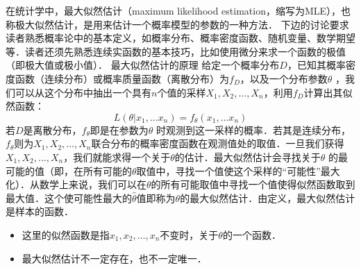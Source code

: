 \begin{issues}
\issueTODO
\end{issues}

在统计学中，最大似然估计（maximum likelihood estimation，缩写为MLE），也称极大似然估计，是用来估计一个概率模型的参数的一种方法．
下边的讨论要求读者熟悉概率论中的基本定义，如概率分布、概率密度函数、随机变量、数学期望等．读者还须先熟悉连续实函数的基本技巧，比如使用微分来求一个函数的极值（即极大值或极小值）．
最大似然估计的原理
给定一个概率分布$D $，已知其概率密度函数（连续分布）或概率质量函数（离散分布）为$f_D $，以及一个分布参数$\theta $ ，我们可以从这个分布中抽出一个具有$n$个值的采样$X_{1},X_{2},... ,X_{n} $，利用$f_D$计算出其似然函数：
$$
L(\theta|x_1,...x_n ) = f_{\theta }(x_1,...x_n )
$$
若$D$是离散分布，$f_{\theta }$即是在参数为$\theta$ 时观测到这一采样的概率．若其是连续分布，$f_{\theta }$则为$X_{1},X_{2},... ,X_{n} $联合分布的概率密度函数在观测值处的取值．一旦我们获得$X_{1},X_{2},... ,X_{n} $，我们就能求得一个关于$\theta $的估计．最大似然估计会寻找关于$\theta$ 的最可能的值（即，在所有可能的$\theta $取值中，寻找一个值使这个采样的“可能性”最大化）．从数学上来说，我们可以在$\theta $的所有可能取值中寻找一个值使得似然函数取到最大值．这个使可能性最大的$\widehat{\theta}$值即称为$\theta $的最大似然估计．由定义，最大似然估计是样本的函数．
\begin{itemize}
\item 这里的似然函数是指$x_1,x_2,\ldots,x_n$不变时，关于$\theta $的一个函数．
\item 最大似然估计不一定存在，也不一定唯一．
\end{itemize}
